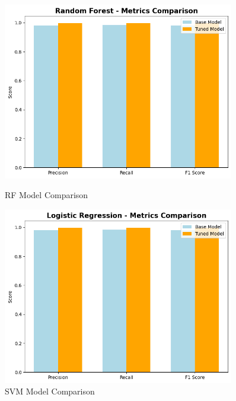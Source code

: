             \begin{figure}[h]
                    \centering
                    \begin{minipage}[c]{0.47\textwidth}
                        \centering
                        \includegraphics[width=0.9\textwidth]{../figures/plots/section2/Random_Forest_Metric_comparison.png}
                        \caption{RF Model Comparison}
                        \label{fig:logistic_tuning}
                    \end{minipage}
                    \hfill
                    \begin{minipage}[c]{0.47\textwidth}
                        \centering
                        \includegraphics[width=0.9\textwidth]{../figures/plots/section2/Logistic_Regression_Metric_comparison.png}
                        \caption{SVM Model Comparison}
                        \label{fig:logistic_cm}
                    \end{minipage}
                \end{figure}

